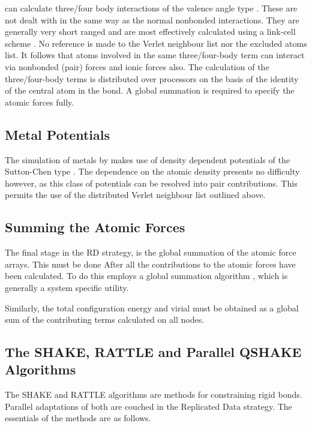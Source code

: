 \D{} can calculate three/four body interactions of the valence
angle type \cite{vessal-90a}. These are not dealt with in the same way
as the normal nonbonded interactions. They are generally very short
ranged and are most effectively calculated using a link-cell scheme
\cite{hockney-81a}. No reference is made to the Verlet neighbour list
nor the excluded atoms list. It follows that atoms involved in the
same three/four-body term can interact via nonbonded (pair) forces and
ionic forces also. The calculation of the three/four-body terms is
distributed over processors on the basis of the identity of the
central atom in the bond. A global summation is required to specify
the atomic forces fully.

\subsection{Metal Potentials}

The simulation of metals by \D{} makes use of density dependent
potentials of the Sutton-Chen type \cite{sutton-90a}. The dependence on
the atomic density presents no difficulty however, as this class of
potentials can be resolved into pair contributions. This permits the
use of the distributed Verlet neighbour list outlined above.

\subsection{Summing the Atomic Forces}

The final stage in the RD strategy, is the global summation of the
atomic force arrays. This must be done After all the contributions to
the atomic forces have been calculated. To do this \D{} employs a
global summation algorithm \cite{smith-91a}, which is generally a
system specific utility.

Similarly, the total configuration energy and virial must be obtained as
a global sum of the contributing terms calculated on all nodes.


\subsection{The SHAKE, RATTLE and Parallel QSHAKE Algorithms}
\label{parshake}

The SHAKE and RATTLE
algorithms are methods for constraining rigid bonds. Parallel
adaptations of both are couched in the Replicated
Data strategy. The essentials of the methods are as follows.

